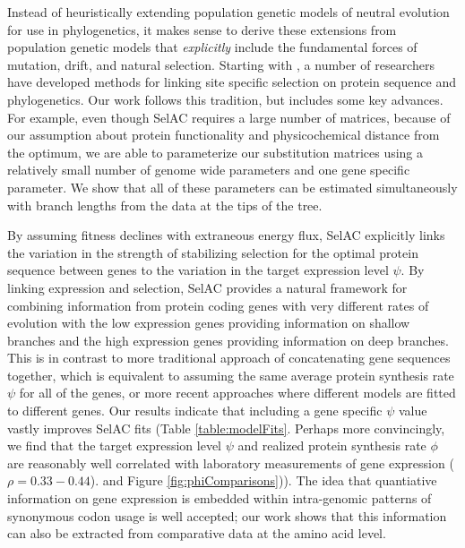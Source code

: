\documentclass{article}
\newcommand{\selac}{SelAC\xspace}
\begin{document}
Instead of heuristically extending population genetic models of neutral evolution for use in phylogenetics, it makes sense to derive these extensions from population genetic models that \emph{explicitly} include the fundamental forces of mutation, drift, and natural selection. %
Starting with \citet{HalpernAndBruno1998}, a number of researchers have developed methods for linking site specific selection on protein sequence and phylogenetics\citep[e.g.~][]{KoshiEtAl1999,DimmicEtAl2000,KoshiAndGoldstein2001,RobinsonEtAl2003,LartillotAndPhilippe2004,ThorneEtAl2012,RodrigueAndLartillot2014}. %
Our work follows this tradition, but includes some key advances.
For example, even though \selac requires a large number of matrices, because of our assumption about protein functionality and physicochemical distance from the optimum, we are able to parameterize our substitution matrices using a relatively small number of genome wide parameters and one gene specific parameter.
We show that all of these parameters can be estimated simultaneously with branch lengths from the data at the tips of the tree.

By assuming fitness declines with extraneous energy flux, \selac explicitly links the variation in the strength of stabilizing selection for the optimal protein sequence between genes to the variation in the target expression level $\psi$.
By linking expression and selection, \selac provides a natural framework for combining information from protein coding genes with very different rates of evolution with the low expression genes providing information on shallow branches and the high expression genes providing information on deep branches.
This is in contrast to more traditional approach of concatenating gene sequences together, which is equivalent to assuming the same average protein synthesis rate $\psi$ for all of the genes, or more recent approaches where different models are fitted to different genes.
Our results indicate that including a gene specific $\psi$ value vastly improves \selac fits (Table \ref{table:modelFits}.
Perhaps more convincingly, we find that the target expression level $\psi$ and realized protein synthesis rate $\phi$ are reasonably well correlated with laboratory measurements of gene expression ($\rho = 0.33-0.44$). and Figure \ref{fig:phiComparisons})).
The idea that quantiative information on gene expression is embedded within intra-genomic patterns of synonymous codon usage is well accepted; our work shows that this information can also be extracted from comparative data at the amino acid level.
\end{document}

